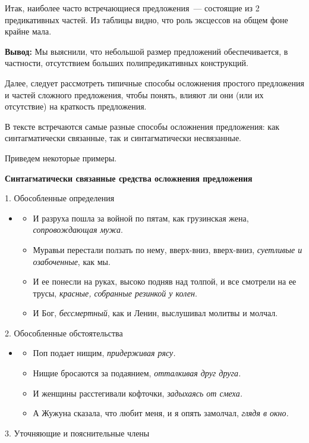 \documentclass{kursa4}
\begin{document}
    \bigskip

    {Итак, наиболее часто встречающиеся предложения~---
    состоящие из 2 предикативных частей. Из таблицы видно, что роль
    эксцессов на общем фоне крайне мала. }

    {}\textbf{{Вывод:}}{
    Мы выяснили, что небольшой размер предложений обеспечивается, в
    частности, отсутствием больших полипредикативных конструкций. }

    { Далее, следует рассмотреть типичные способы
    осложнения простого предложения и частей сложного предложения, чтобы
    понять, влияют ли они (или их
    отс}{ут}{с}{т}{вие)
    на краткость предложения. }

    {В тексте встречаются самые разные способы
    осложнения предложения: как синтагматически связанные, так и
    синтагматически несвязанные. }

    {Приведем некоторые примеры.}


    \bigskip

    {\centering
    \textbf{{Синтагматически связанные средства осложнения
    предложения}}
    \par}

    {1. Обособленные определения}

    \begin{itemize}
    \item \begin{itemize}
    \item {И разруха пошла за войной по пятам, как
    грузинская жена, }\textit{{сопровождающая
    мужа}}{.}
    \item {Муравьи перестали ползать по нему, вверх-вниз,
    вверх-вниз, }\textit{{суетливые и
    озабоченные}}{, как мы.}
    \item {И ее понесли на руках, высоко подняв над толпой,
    и все смотрели на ее трусы, }\textit{{красные,
    собранные резинкой у колен}}{.}
    \item {И Бог,
    }\textit{{бессмертный}}{, как и
    Ленин, выслушивал молитвы и молчал.}
    \end{itemize}
    \end{itemize}
    {2. Обособленные обстоятельства}

    \begin{itemize}
    \item \begin{itemize}
    \item Поп подает нищим, \textit{придерживая рясу.}
    \item Нищие бросаются за подаянием, \textit{отталкивая друг друга.}
    \item И женщины расстегивали кофточки, \textit{задыхаясь от смеха.}
    \item А Жужуна сказала, что любит меня, и я опять замолчал,\textit{
    глядя в окно.}
    \end{itemize}
    \end{itemize}
    3. Уточняющие и пояснительные члены
\end{document}

